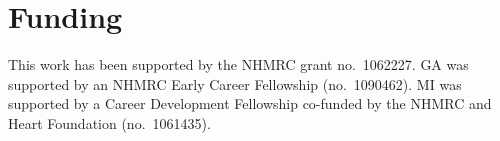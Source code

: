 \documentclass{bioinfo}
\begin{document}
\section*{Funding}

This work has been supported by the NHMRC grant no.~1062227. GA was supported
by an NHMRC Early Career Fellowship (no.~1090462). MI was supported by a
Career Development Fellowship co-funded by the NHMRC and Heart Foundation
(no.~1061435).\vspace*{-12pt}




%
%
%
%
%
%
%
\end{document}
